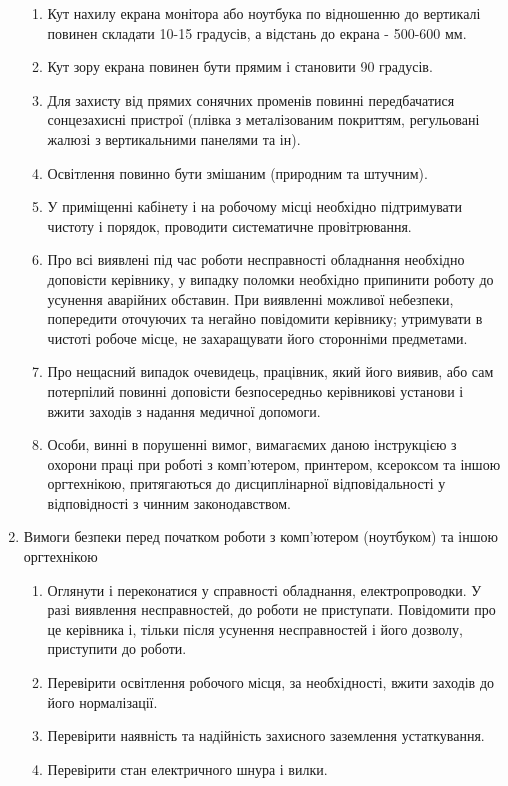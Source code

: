 \begin{enumerate}
\begin{enumerate}
        \item Кут нахилу екрана монітора або ноутбука по відношенню до вертикалі повинен складати 10-15 градусів, а відстань до екрана - 500-600 мм.
        \item Кут зору екрана повинен бути прямим і становити 90 градусів.
        \item Для захисту від прямих сонячних променів повинні передбачатися сонцезахисні пристрої (плівка з металізованим покриттям, регульовані жалюзі з вертикальними панелями та ін).
        \item Освітлення повинно бути змішаним (природним та штучним).
        \item У приміщенні кабінету і на робочому місці необхідно підтримувати чистоту і порядок, проводити систематичне провітрювання.
        \item Про всі виявлені під час роботи несправності обладнання необхідно доповісти керівнику, у випадку поломки необхідно припинити роботу до усунення аварійних обставин. При виявленні можливої небезпеки, попередити оточуючих та негайно повідомити керівнику; утримувати в чистоті робоче місце, не захаращувати його сторонніми предметами.
        \item Про нещасний випадок очевидець, працівник, який його виявив, або сам потерпілий повинні доповісти безпосередньо керівникові установи і вжити заходів з надання медичної допомоги.
        \item Особи, винні в порушенні вимог, вимагаємих даною інструкцією з охорони праці при роботі з комп'ютером, принтером, ксероксом та іншою оргтехнікою, притягаються до дисциплінарної відповідальності у відповідності з чинним законодавством.
    \end{enumerate}
    \item Вимоги безпеки перед початком роботи з комп'ютером (ноутбуком) та іншою оргтехнікою
    \begin{enumerate}
        \item Оглянути і переконатися у справності обладнання, електропроводки. У разі виявлення несправностей, до роботи не приступати. Повідомити про це керівника і, тільки після усунення несправностей і його дозволу, приступити до роботи.
        \item Перевірити освітлення робочого місця, за необхідності, вжити заходів до його нормалізації.
        \item Перевірити наявність та надійність захисного заземлення устаткування.
        \item Перевірити стан електричного шнура і вилки.

\end{enumerate}
\end{enumerate}
